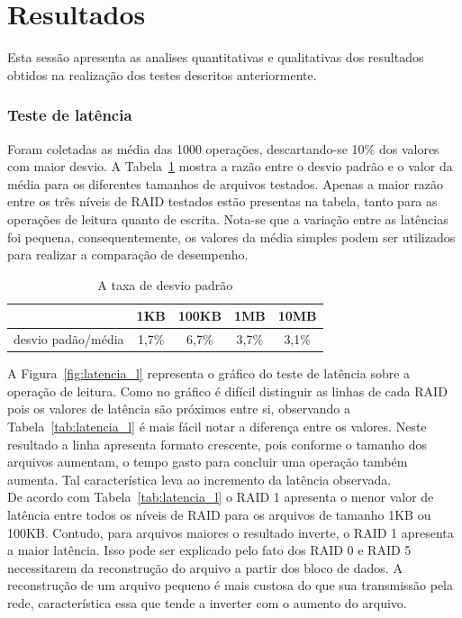 
	\section{Resultados}
	Esta sessão apresenta as analises quantitativas e qualitativas dos resultados obtidos na realização dos testes descritos anteriormente.
	\\
	
	\subsubsection{Teste de latência}
	Foram coletadas as média das 1000 operações, descartando-se 10\% dos valores com maior desvio. A Tabela~\ref{tab:desvio_padrao} mostra a razão entre o desvio padrão e o valor da média para os diferentes tamanhos de arquivos testados. Apenas a maior razão entre os três níveis de RAID testados estão presentas na tabela, tanto para as operações de leitura quanto de escrita. Nota-se que a variação entre as latências foi pequena, consequentemente, os valores da média simples podem ser utilizados para realizar a comparação de desempenho. 
	\\
	
	\capstartfalse
	\begin{table} [htb]
		\caption{A taxa de desvio padrão}
		\centering
		\begin{tabular}{|l|c|c|c|c|} \hline
						& 1KB	& 100KB		& 1MB		& 10MB  \\ \hline
			desvio padão/média	& 1,7\%	& 6,7\%		& 3,7\%		& 3,1\% \\ \hline
		\end{tabular}
		\label{tab:desvio_padrao}
	\end{table}
	\capstarttrue
	
	A Figura~\ref{fig:latencia_l} representa o gráfico do teste de latência sobre a operação de leitura. Como no gráfico é difícil distinguir as linhas de cada RAID pois os valores de latência são próximos entre si, observando a Tabela~\ref{tab:latencia_l} é mais fácil notar a diferença entre os valores. Neste resultado a linha apresenta formato crescente, pois conforme o tamanho dos arquivos aumentam, o tempo gasto para concluir uma operação também aumenta. Tal característica leva ao incremento da latência observada.
	\\
	 
	De acordo com Tabela~\ref{tab:latencia_l} o RAID 1 apresenta o menor valor de latência entre todos os níveis de RAID para os arquivos de tamanho 1KB ou 100KB. Contudo, para arquivos maiores o resultado inverte, o RAID 1 apresenta a maior latência. Isso pode ser explicado pelo fato dos RAID 0 e RAID 5 necessitarem da reconstrução do arquivo a partir dos bloco de dados. A reconstrução de um arquivo pequeno é mais custosa do que sua transmissão pela rede, característica essa que tende a inverter com o aumento do arquivo.
	\\
	
